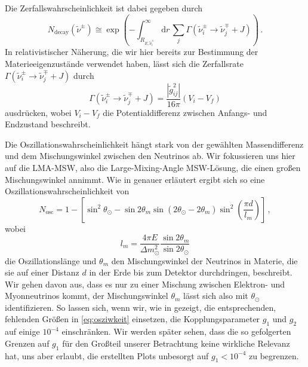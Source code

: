 Die Zerfallswahrscheinlichkeit ist dabei gegeben durch
\begin{equation}
    N_\text{decay}(\tilde{\nu}^\pm) \cong \exp \left(- \int^\infty_{R_{E, \tilde{\nu}^\pm_i}} \mathrm{d}r \, \sum_j \Gamma(\tilde{\nu}^\pm_i \rightarrow \tilde{\nu}^\mp_j + J) \right) \,.
    \label{eq:zerfallswkeit}
\end{equation}
In relativistischer Näherung, die wir hier bereits zur Bestimmung der Materieeigenzustände verwendet haben, lässt sich die Zerfallsrate $\Gamma(\tilde{\nu}^\pm_i \rightarrow \tilde{\nu}^\mp_j + J)$ durch
\begin{equation}
    \Gamma(\tilde{\nu}^\pm_i \rightarrow \tilde{\nu}^\mp_j + J) = \frac{|\tilde{g}^2_{i j}|}{16 \pi} \left(V_i - V_f \right)
    \label{eq:zerfallsrate}
\end{equation}
ausdrücken, wobei $V_i - V_f$ die Potentialdifferenz zwischen Anfangs- und Endzustand beschreibt.

Die Oszillationswahrscheinlichkeit hängt stark von der gewählten Massendifferenz und dem Mischungswinkel zwischen den Neutrinos ab.
Wir fokussieren uns hier auf die LMA-MSW, also die Large-Mixing-Angle MSW-Lösung, die einen großen Mischungswinkel annimmt.
Wie in \cite{ueberlebenswkeit} genauer erläutert ergibt sich so eine Oszillationswahrscheinlichkeit von
\begin{equation}
    N_\text{osc} = 1 - \left[\sin^2\theta_\odot - \sin 2\theta_m \sin\left(2\theta_\odot - 2 \theta_m\right) \sin^2 \left(\frac{\pi d}{l_m}\right)\right] \,,
    \label{eq:osziwkeit}
\end{equation}
wobei
\begin{equation*}
    l_m = \frac{4 \pi E}{\Delta m^2_\odot} \frac{\sin2\theta_m}{\sin2\theta_\odot}
\end{equation*}
die Oszillationslänge und $\theta_m$ den Mischungswinkel der Neutrinos in Materie, die sie auf einer Distanz $d$ in der Erde bis zum Detektor durchdringen, beschreibt.
Wir gehen davon aus, dass es nur zu einer Mischung zwischen Elektron- und Myonneutrinos kommt, der Mischungswinkel $\theta_m$ lässt sich also mit $\theta_\odot$ identifizieren.
So lassen sich, wenn wir, wie in \cite{supernovaboundsdasandere} gezeigt, die entsprechenden, fehlenden Größen in \eqref{eq:osziwkeit} einsetzen, die Kopplungsparameter $g_1$ und $g_2$ auf einige $10^{-4}$ einschränken.
Wir werden später sehen, dass die so gefolgerten Grenzen auf $g_1$ für den Großteil unserer Betrachtung keine wirkliche Relevanz hat, uns aber erlaubt, die erstellten Plots unbesorgt auf $g_1 < 10^{-4}$ zu begrenzen. 

